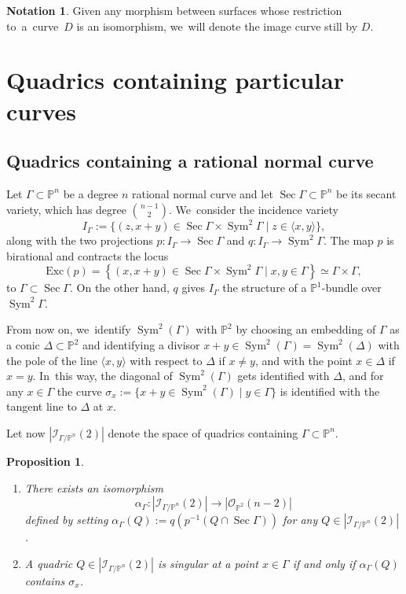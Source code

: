 \documentclass[11pt]{article}
\newcommand{\skpt}{\smallskip}
\theoremstyle{plain}
\newtheorem{prop}[thm]{Proposition}
\theoremstyle{definition}
\newtheorem{notation}[thm]{Notation}
\DeclareMathOperator{\Sec}{Sec}
\DeclareMathOperator{\Sym}{Sym}
\newcommand\PP{{\mathbb P}}
\newcommand\I{{\mathcal I}}
\begin{document}
\begin{notation}\label{pinguini}
Given any morphism between surfaces whose restriction to~a~curve~$D$ is an isomorphism, we~will denote the image curve still by $D$.
\end{notation}

\section{Quadrics containing particular curves}\label{figo}

\subsection{Quadrics containing a rational normal curve}\label{federico}

Let $\Gamma\subset \PP^n$ be a degree $n$ rational normal curve and let $\Sec\Gamma\subset \PP^n$ be its secant variety, which has degree $\binom{n-1}{2}$. We~consider the incidence variety
\[
I_\Gamma:=\bigl\{(z,x+y)\in \Sec\Gamma\times \Sym^2\Gamma\mid z\in \langle x,y\rangle \bigr\},
\]
along with the two projections $p:I_\Gamma\to \Sec\Gamma$ and $q: I_\Gamma\to \Sym^2\Gamma$. The map $p$ is birational and contracts the locus
\[
\mathrm{Exc} (p)=\left\{(x,x+y)\in \Sec\Gamma\times \Sym^2\Gamma\mid x,y\in \Gamma \right\}\simeq \Gamma\times \Gamma,
\]
to $\Gamma\subset \Sec\Gamma$. On the other hand, $q$ gives $I_\Gamma$ the structure of a $\PP^1$-bundle over $\Sym^2\Gamma$.

From now on, we~identify $\Sym^2(\Gamma)$ with $\PP^2$ by choosing an embedding of $\Gamma$ as a conic $\Delta\subset \PP^2$ and identifying a divisor $x+y\in \Sym^2(\Gamma)=\Sym^2(\Delta)$ with the pole of the line $\langle x,y\rangle$ with respect to $\Delta$ if $x\neq y$, and with the point $x\in \Delta$ if $x=y$. In~this way, the diagonal of $\Sym^2(\Gamma)$ gets identified with $\Delta$, and for any $x\in \Gamma$ the curve $\sigma_x:=\{x+y\in \Sym^2(\Gamma)\mid y\in \Gamma\}$ is identified with the tangent line to $\Delta$ at $x$.

Let now $|\I_{\Gamma/\PP^n}(2)|$ denote the space of quadrics containing $\Gamma\subset \PP^n$.

\skpt

\begin{prop}\label{razionale}
\begin{enumerate}
\item\label{razionalei}
There exists an isomorphism
\[
\alpha_\Gamma: |\I_{\Gamma/\PP^n}(2)|\to |\mathcal O_{\PP^2}(n-2)|
\]
defined by setting $\alpha_\Gamma(Q):=q(p^{-1}(Q\cap\Sec \Gamma))$ for any $Q\in |\I_{\Gamma/\PP^n}(2)|$.
\item\label{razionaleii}
A quadric $Q\in |\I_{\Gamma/\PP^n}(2)|$ is singular at a point $x\in \Gamma$ if and only if $\alpha_\Gamma(Q)$ contains $\sigma _x$.
\end{enumerate}
\end{prop}
\end{document}
